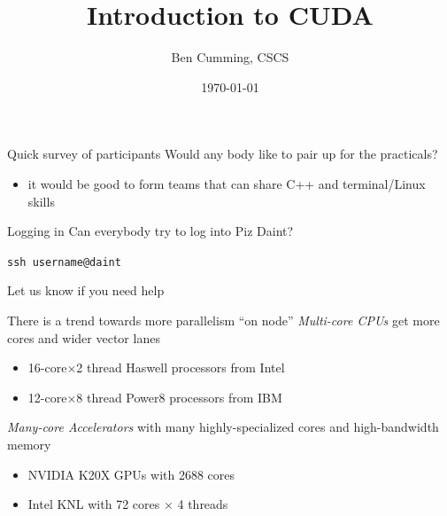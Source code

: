 \documentclass[aspectratio=43]{beamer}
\author{Ben Cumming, CSCS}
\title{Introduction to CUDA}
\subtitle{}
\date{\today}
\begin{document}
\cscstitle

\begin{frame}[fragile]{}
    \begin{info}{Quick survey of participants}
        Would any body like to pair up for the practicals?
        \begin{itemize}
            \item it would be good to form teams that can share C++ and terminal/Linux skills
        \end{itemize}
    \end{info}

    \begin{info}{Logging in}
        Can everybody try to log into Piz Daint?
        \begin{center}
            \verb!ssh username@daint!
        \end{center}
        Let us know if you need help
    \end{info}

\end{frame}

\begin{frame}[fragile]{}
    \begin{info}{There is a trend towards more parallelism ``on node''}
        \emph{Multi-core CPUs} get more cores and wider vector lanes
        \begin{itemize}
            \item 16-core$\times$2 thread Haswell processors from Intel
            \item 12-core$\times$8 thread Power8 processors from IBM
        \end{itemize}
        \emph{Many-core Accelerators} with many highly-specialized cores and high-bandwidth memory
        \begin{itemize}
            \item NVIDIA K20X GPUs with 2688 cores
            \item Intel KNL with 72 cores $\times$ 4 threads
        \end{itemize}
    \end{info}

\end{frame}
\end{document}
